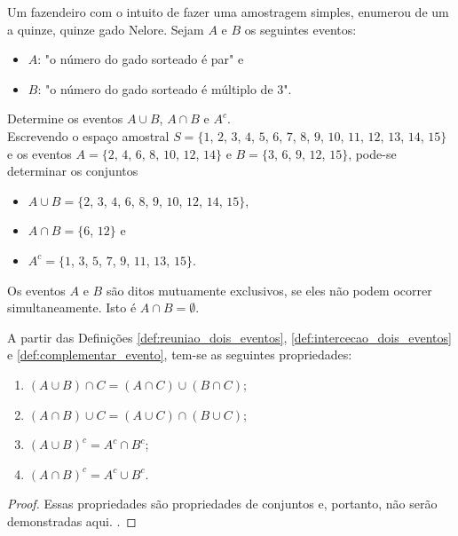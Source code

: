 \documentclass[11pt,fleqn]{book}
\numberwithin{mpicture}{chapter}
\numberwithin{mtable}{chapter}
\numberwithin{mframe}{chapter}
\begin{document}
\begin{example}
	Um fazendeiro com o intuito de fazer uma amostragem simples, enumerou de um a quinze, quinze gado Nelore. Sejam $A$ e $B$ os seguintes eventos:
	\begin{itemize}
		\item $A$: "o número do gado sorteado é par" e
		\item $B$: "o número do gado sorteado é múltiplo de 3".
	\end{itemize}
	
	Determine os eventos $A\cup B$, $A\cap B$ e $A^{c}$.\\
	
	Escrevendo o espaço amostral $S=\{1$, $2$, $3$, $4$, $5$, $6$, $7$, $8$, $9$, $10$, $11$, $12$, $13$, $14$, $15\}$ e os eventos $A=\{2$, $4$, $6$, $8$, $10$, $12$, $14\}$ e $B=\{3$, $6$, $9$, $12$, $15\}$, pode-se determinar os conjuntos
	\begin{itemize}
		\item $A\cup B=\{2$, $3$, $4$, $6$, $8$, $9$, $10$, $12$, $14$, $15\}$,
		\item $A\cap B=\{6$, $12\}$ e
		\item $A^{c}=\{1$, $3$, $5$, $7$, $9$, $11$, $13$, $15\}$.
	\end{itemize}
\end{example}

\begin{remark}
	Os eventos $A$ e $B$ são ditos mutuamente exclusivos, se eles não podem ocorrer simultaneamente. Isto é $A\cap B=\emptyset$.
\end{remark}

\begin{theorem}
	A partir das Definições \ref{def:reuniao_dois_eventos}, \ref{def:intercecao_dois_eventos} e \ref{def:complementar_evento}, tem-se as seguintes propriedades:
	\begin{enumerate}
		\item $(A\cup B)\cap C = (A\cap C)\cup (B\cap C)$;
		\item $(A\cap B)\cup C = (A\cup C)\cap (B\cup C)$;
		\item $(A\cup B)^c = A^c \cap B^c$;
		\item $(A\cap B)^c= A^c\cup B^c$.
	\end{enumerate}
	
	\begin{proof}
		Essas propriedades são propriedades de conjuntos e, portanto, não serão demonstradas aqui. .
	\end{proof}
\end{theorem}
\end{document}
